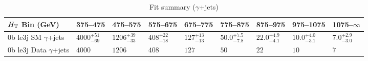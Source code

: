 \documentclass[8pt]{article}
\def\scalht{\mbox{$H_{\rm{T}}$}\xspace}
\newcommand\T{\rule{0pt}{2.6ex}}
\begin{document}
\begin{table}[ht!]
\caption{Fit summary ($\gamma$+jets)}
\label{tab:ensemble-summary}
\centering
\begin{tabular}{ lllllllll }

\hline
\scalht Bin (GeV)       & 375--475                       & 475--575                       & 575--675                       & 675--775                       & 775--875                       & 875--975                       & 975--1075                      & 1075--$\infty$                 \\ [1.000000ex]
\hline
0b le3j SM $\gamma$+jets\T & $4000^{+51}_{-69}$             & $1206^{+39}_{-33}$             & $408^{+22}_{-18}$              & $127^{+13}_{-13}$              & $50.0^{+7.5}_{-7.8}$           & $22.0^{+4.9}_{-4.1}$           & $10.0^{+4.0}_{-3.1}$           & $7.0^{+2.9}_{-3.0}$            \\ 
0b le3j Data $\gamma$+jets\T & $4000$                         & $1206$                         & $408$                          & $127$                          & $50$                           & $22$                           & $10$                           & $7$                            \\ 
\hline

\end{tabular}
\end{table}
\end{document}
